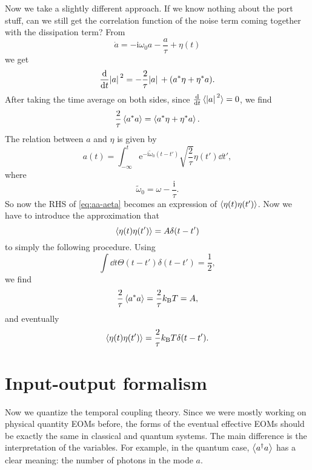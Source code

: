 \documentclass[hyperref, a4paper]{article}
\newcommand*{\ii}{\mathrm{i}}
\newcommand*{\ee}{\mathrm{e}}
\newcommand*{\kB}{k_{\text{B}}}
\begin{document}
Now we take a slightly different approach. 
If we know nothing about the port stuff, 
can we still get the correlation function of the noise term 
coming together with the dissipation term?
From 
\begin{equation}
    \dot{a} = - \ii \omega_0 a - \frac{a}{\tau} + \eta(t)
\end{equation}
we get 
\begin{equation}
    \dv{t} \abs*{a}^2 = - \frac{2}{\tau} \abs*{a} + (a^* \eta + \eta^* a).
\end{equation}
After taking the time average on both sides, 
since $\dv{t} \expval*{\abs*{a}^2} = 0$,
we find 
\begin{equation}
    \frac{2}{\tau} \expval{a^* a} = \expval{a^* \eta + \eta^* a}.
    \label{eq:aa-aeta}
\end{equation}
The relation between $a$ and $\eta$ is given by 
\begin{equation}
    a(t) = \int_{-\infty}^{t} \ee^{- \ii \tilde{\omega}_0 (t - t')} \sqrt{\frac{2}{\tau}} \eta(t') \dd{t'},
\end{equation}
where 
\begin{equation}
    \tilde{\omega}_0 = \omega - \frac{\ii}{\tau}.
\end{equation}
So now the RHS of \eqref{eq:aa-aeta} becomes an expression of $\expval{\eta(t) \eta(t')}$.
Now we have to introduce the approximation that 
\begin{equation}
    \expval{\eta(t) \eta(t')} = A \delta(t - t')
\end{equation}
to simply the following procedure. 
Using 
\[
    \int \dd{t} \Theta(t - t') \delta(t - t') = \frac{1}{2},
\]
we find 
\[
    \frac{2}{\tau} \expval{a^* a} = \frac{2}{\tau} \kB T = A,
\]
and eventually
\begin{equation}
    \expval{\eta(t) \eta(t')} = \frac{2}{\tau} \kB T \delta(t - t').
\end{equation}

\section{Input-output formalism}

Now we quantize the temporal coupling theory.
Since we were mostly working on physical quantity EOMs before,
the forms of the eventual effective EOMs should be exactly the same 
in classical and quantum systems.
The main difference is the interpretation of the variables.
For example, in the quantum case,
$\expval{a^\dagger a}$ has a clear meaning:
the number of photons in the mode $a$.
\end{document}

